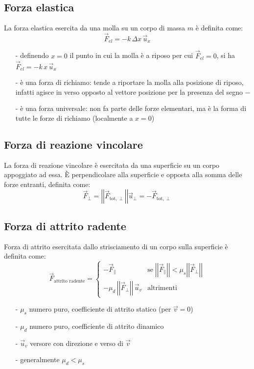 \documentclass[a4paper]{article}
\newcommand\ux{\vec{u}_x}
\newcommand\uv{\vec{u}_v}
\newcommand\uper{\vec{u}_\perp}
\newcommand\vmod[1]{\left|\left|{#1}\right|\right|}
\begin{document}
\subsection{Forza elastica}
La forza elastica esercita da una molla su un corpo di massa \(m\) è definita come:
\[\vec{F}_{el} = -k \, \Delta x \, \ux\]
\begin{itemize}[topsep=3pt, itemsep=0pt]
	\item[-] definendo \(x=0\) il punto in cui la molla è a riposo per cui \(\vec{F}_{el} = 0\), si ha \(\vec{F}_{el} = -k \, x \, \ux\)
	\item[-] è una forza di richiamo: tende a riportare la molla alla posizione di riposo, infatti agisce in verso opposto al vettore
	posizione per la presenza del segno \(-\)
	\item[-] è una forza universale: non fa parte delle forze elementari, ma è la forma di tutte le forze di richiamo (localmente a \(x = 0\))
\end{itemize}

\subsection{Forza di reazione vincolare}
La forza di reazione vincolare è esercitata da una superficie su un corpo appoggiato ad essa. È perpendicolare alla superficie e
opposta alla somma delle forze entranti, definita come:
\[\vec{F}_\perp = \vmod{\vec{F}_{\text{tot},\perp}} \uper = -\vec{F}_{\text{tot},\perp}\]

\subsection{Forza di attrito radente}
Forza di attrito esercitata dallo strisciamento di un corpo sulla superficie è definita come:
\[\vec{F}_\text{attrito radente} = \begin{cases}
	-\vec{F}_{\parallel} &\text{se} \; \vmod{\vec{F}_\parallel} < \mu_s \vmod{\vec{F}_\perp}\\
	-\mu_d \, \vmod{\vec{F}_\perp} \, \uv &\text{altrimenti}
\end{cases}\]

\begin{itemize}[topsep=3pt, itemsep=0pt]
	\item[-] \(\mu_s\) numero puro, coefficiente di attrito statico (per \(\vec{v}=0\))
	\item[-] \(\mu_d\) numero puro, coefficiente di attrito dinamico
	\item[-] \(\uv\) versore con direzione e verso di \(\vec{v}\)
	\item[-] generalmente \(\mu_d < \mu_s\)
\end{itemize}
\end{document}
